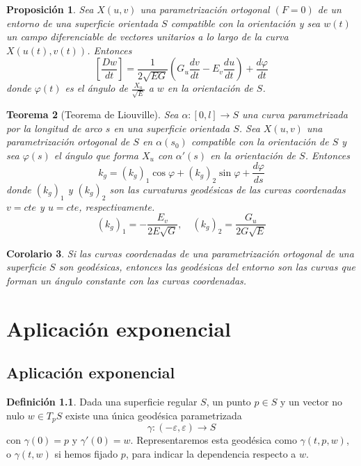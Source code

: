 \documentclass{report}
\newtheorem{theorem}{Teorema}[chapter]
\newtheorem{corollary}[theorem]{Corolario}
\newtheorem{proposition}[theorem]{Proposición}
\theoremstyle{remark}
\theoremstyle{remark}
\theoremstyle{definition}
\newtheorem{definition}{Definición}[chapter]
\theoremstyle{definition}
\theoremstyle{definition}
\begin{document}
\begin{proposition}
    Sea $X(u, v)$ una parametrización ortogonal $(F=0)$ de un entorno de una superficie orientada $S$ compatible con la orientación y sea $w(t)$ un campo diferenciable de vectores unitarios a lo largo de la curva $X(u(t), v(t))$. Entonces
    $$\left[ \frac{Dw}{dt} \right] = \frac{1}{2\sqrt{EG}} \left( G_u \frac{dv}{dt} - E_v \frac{du}{dt} \right) + \frac{d\varphi}{dt}$$
    donde $\varphi(t)$ es el ángulo de $\frac{X_u}{\sqrt{E}}$ a $w$ en la orientación de $S$.
\end{proposition}

\begin{theorem}[Teorema de Liouville]
    Sea $\alpha : [0, l] \to S$ una curva parametrizada por la longitud de arco $s$ en una superficie orientada $S$.
    Sea $X(u, v)$ una parametrización ortogonal de $S$ en $\alpha(s_0)$ compatible con la orientación de $S$ y sea $\varphi(s)$ el ángulo que forma $X_u$ con $\alpha'(s)$ en la orientación de $S$. Entonces
    $$k_g = {(k_g)}_1\cos\varphi + {(k_g)}_2\sin\varphi + \frac{d\varphi}{ds}$$
    donde ${(k_g)}_1$ y ${(k_g)}_2$ son las curvaturas geodésicas de las curvas coordenadas $v = cte$ y $u = cte$, respectivamente.
    $${(k_g)}_1 = -\frac{E_v}{2E\sqrt{G}}, \quad {(k_g)}_2 = \frac{G_u}{2G\sqrt{E}}$$
\end{theorem}

\begin{corollary}
    Si las curvas coordenadas de una parametrización ortogonal de una superficie $S$ son geodésicas, entonces las geodésicas del entorno son las curvas que forman un ángulo constante con las curvas coordenadas.
\end{corollary}

\chapter{Aplicación exponencial}

\section{Aplicación exponencial}

\begin{definition}
    Dada una superficie regular $S$, un punto $p \in S$ y un vector no nulo $w \in T_pS$ existe una única geodésica parametrizada
    $$\gamma : (-\varepsilon, \varepsilon) \to S$$
    con $\gamma(0) = p$ y $\gamma'(0) = w$.
    Representaremos esta geodésica como $\gamma(t,p,w)$, o $\gamma(t,w)$ si hemos fijado $p$, para indicar la dependencia respecto a $w$.
\end{definition}
\end{document}
